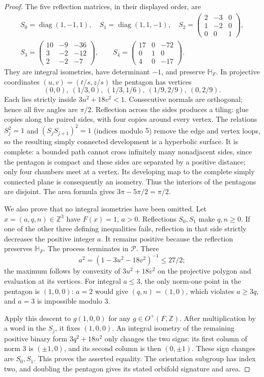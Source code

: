 \begin{proof}
The five reflection matrices, in their displayed order, are
\[
 \begin{gathered}
 S_0=\operatorname{diag}(1,-1,1),\quad
 S_1=\operatorname{diag}(1,1,-1),\quad
 S_2=\begin{pmatrix}2&-3&0\\1&-2&0\\0&0&1\end{pmatrix},\\
 S_3=\begin{pmatrix}10&-9&-36\\3&-2&-12\\2&-2&-7\end{pmatrix},\qquad
 S_4=\begin{pmatrix}17&0&-72\\0&1&0\\4&0&-17\end{pmatrix}.
 \end{gathered}
\]
They are integral isometries, have determinant $-1$, and preserve
$\mathbb H_F$. In projective coordinates $(u,v)=(t/s,z/s)$ the pentagon
has vertices
\[
 (0,0),\ (1/3,0),\ (1/3,1/6),\ (1/9,2/9),\ (0,2/9).
\]
Each lies strictly inside $3u^2+18v^2<1$. Consecutive normals are
orthogonal; hence all five angles are $\pi/2$. Reflection across the sides
produces a tiling: glue copies along the paired sides, with four copies
around every vertex. The relations $S_j^2=1$ and
$(S_jS_{j+1})^2=1$ (indices modulo $5$) remove the edge and vertex loops,
so the resulting simply connected development is a hyperbolic surface.
It is complete: a bounded path cannot cross infinitely many nonadjacent
sides, since the pentagon is compact and these sides are separated by a
positive distance; only four chambers meet at a vertex. Its developing
map to the complete simply connected plane is consequently an isometry.
Thus the interiors of the pentagons are disjoint. The area formula gives
$3\pi-5\pi/2=\pi/2$.

We also prove that no integral isometries have been omitted. Let
$x=(a,q,n)\in\mathbb Z^3$ have $F(x)=1$, $a>0$. Reflections $S_0,S_1$
make $q,n\geq0$. If one of the other three defining inequalities fails,
reflection in that side strictly decreases the positive integer $a$.
It remains positive because the reflection preserves $\mathbb H_F$.
The process terminates in $\mathcal P$. There
\[
 a^2=(1-3u^2-18v^2)^{-1}\leq27/2;
\]
the maximum follows by convexity of $3u^2+18v^2$ on the projective polygon
and evaluation at its vertices. For integral $a\leq3$, the only norm-one
point in the pentagon is $(1,0,0)$: $a=2$ would give $(q,n)=(1,0)$,
which violates $a\geq3q$, and $a=3$ is impossible modulo $3$.

Apply this descent to $g(1,0,0)$ for any $g\in O^+(F,\mathbb Z)$.
After multiplication by a word in the $S_j$, it fixes $(1,0,0)$.
An integral isometry of the remaining positive binary form
$3q^2+18n^2$ only changes the two signs: its first column of norm $3$
is $(\pm1,0)$, and its second column is then $(0,\pm1)$.
These sign changes are $S_0,S_1$. This proves the asserted equality.
The orientation subgroup has index two, and doubling the pentagon gives
its stated orbifold signature and area.
\end{proof}

